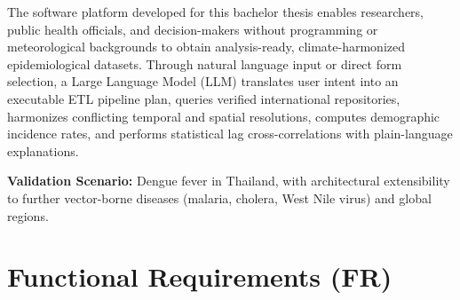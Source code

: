 \documentclass[11pt,a4paper]{article}
\begin{document}
The software platform developed for this bachelor thesis enables researchers, public
health officials, and decision-makers without programming or meteorological backgrounds
to obtain analysis-ready, climate-harmonized epidemiological datasets. Through
natural language input or direct form selection, a Large Language Model (LLM) translates
user intent into an executable ETL pipeline plan, queries verified international repositories,
harmonizes conflicting temporal and spatial resolutions, computes demographic incidence rates,
and performs statistical lag cross-correlations with plain-language explanations.

\textbf{Validation Scenario:} Dengue fever in Thailand, with architectural extensibility
to further vector-borne diseases (malaria, cholera, West Nile virus) and global regions.

\section{Functional Requirements (FR)}
\end{document}
